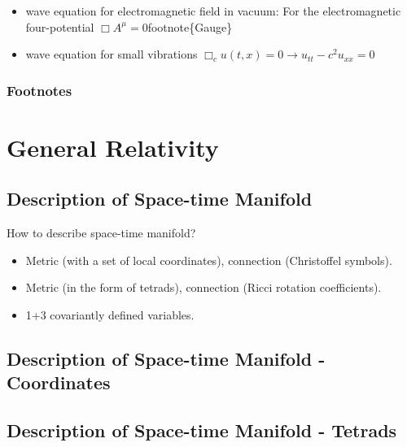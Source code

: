 \documentclass[letterpaper,10pt,english]{sphinxmanual}
\begin{document}
{\begin{description}
\begin{itemize}
\item {} 
wave equation for electromagnetic field in vacuum:
For the electromagnetic four-potential $\Box A^\mu=0$footnote\{Gauge\}

\item {} 
wave equation for small vibrations
$\Box_c u(t,x)=0\rightarrow u_{tt}-c^2 u_{xx}=0$

\end{itemize}

\end{description}


\subsubsection{Footnotes}
\label{SpecialRelativity:footnotes}

\section{General Relativity}
\label{GeneralRelativity::doc}\label{GeneralRelativity:general-relativity}

\subsection{Description of Space-time Manifold}
\label{GeneralRelativity:description-of-space-time-manifold}
How to describe space-time manifold?
\begin{itemize}
\item {} 
Metric (with a set of local coordinates), connection (Christoffel symbols).

\item {} 
Metric (in the form of tetrads), connection (Ricci rotation coefficients).

\item {} 
1+3 covariantly defined variables.

\end{itemize}


\subsection{Description of Space-time Manifold - Coordinates}
\label{GeneralRelativity:description-of-space-time-manifold-coordinates}

\subsection{Description of Space-time Manifold - Tetrads}
\label{GeneralRelativity:description-of-space-time-manifold-tetrads}

}
\end{document}
